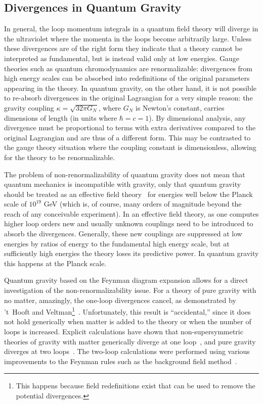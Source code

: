 \subsection{Divergences in Quantum Gravity}

In general, the loop momentum integrals in a quantum field theory will
diverge in the ultraviolet where the momenta in the loops become
arbitrarily large.  Unless these divergences are of the right form
they indicate that a theory cannot be interpreted as 
fundamental, but is instead valid only at low energies.  Gauge
theories such as quantum chromodynamics are renormalizable:
divergences from high energy scales can be absorbed into redefinitions
of the original parameters appearing in the theory. In quantum gravity,
on the other hand, it is not possible to re-absorb divergences in the
original Lagrangian for a very simple reason: the gravity coupling $
\kappa = \sqrt{32 \pi G_N}$, where $G_N$ is Newton's constant, carries
dimensions of length (in units where $\hbar = c = 1$). By dimensional 
analysis, any divergence must be proportional to terms with extra
derivatives compared to the original Lagrangian and are thus of a
different form.  This may be contrasted to the gauge theory situation
where the coupling constant is dimensionless, allowing for the theory
to be renormalizable.

The problem of non-renormalizability of quantum gravity does not mean
that quantum mechanics is incompatible with gravity, only that quantum
gravity should be treated as an effective field
theory~\cite{Weinberg79,Gasser85,Donoghue94,Kaplan95,Manohar96} for
energies well below the Planck scale of $10^{19}$ GeV (which is, of
course, many orders of magnitude beyond the reach of any conceivable
experiment).  In an effective field theory, as one computes higher loop
orders new and usually unknown couplings need to be introduced to
absorb the divergences.  Generally, these new couplings are suppressed
at low energies by ratios of energy to the fundamental high energy
scale, but at sufficiently high energies the theory loses its
predictive power.  In quantum gravity this happens at the Planck
scale.

Quantum gravity based on the Feynman diagram expansion allows for a
direct investigation of the non-renormalizability issue.  For a theory
of pure gravity with no matter, amazingly, the one-loop divergences
cancel, as demonstrated by 't~Hooft and Veltman\footnote{This happens
because field redefinitions exist that can be used to remove the
potential divergences.}~\cite{tHooftVeltmanAnnPoin}. Unfortunately,
this result is ``accidental,'' since it does not hold generically when
matter is added to the theory or when the number of loops is
increased.  Explicit calculations have shown that
non-supersymmetric theories of gravity with matter generically diverge
at one loop~\cite{tHooftVeltmanAnnPoin,Deser74,DeserTsao74}, and pure
gravity diverges at two loops~\cite{Goroff86,vandeVen92}.  The
two-loop calculations were performed using various improvements to the
Feynman rules such as the background field
method~\cite{tHooft75,DeWitt81,Background}.  

